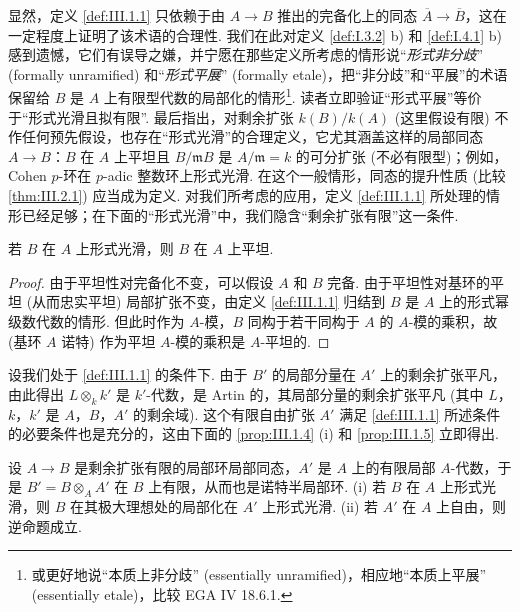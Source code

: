 \begin{remark}\label{rem:III.1.2}
显然，定义 \ref{def:III.1.1} 只依赖于由 $A \to B$ 推出的完备化上的同态 $\overline{A} \to \overline{B}$，这在一定程度上证明了该术语的合理性. 我们在此对定义 \ref{def:I.3.2} b) 和 \ref{def:I.4.1} b) 感到遗憾，它们有误导之嫌，并宁愿在那些定义所考虑的情形说``\emph{形式非分歧}'' (formally unramified) 和``\emph{形式平展}'' (formally etale)，把``非分歧''和``平展''的术语保留给 $B$ 是 $A$ 上有限型代数的局部化的情形\footnote{或更好地说``本质上非分歧'' (essentially unramified)，相应地``本质上平展'' (essentially etale)，比较 EGA IV 18.6.1.}. 读者立即验证``形式平展''等价于``形式光滑且拟有限''. 最后指出，对剩余扩张 $k(B)/k(A)$ (这里假设有限) 不作任何预先假设，也存在``形式光滑''的合理定义，它尤其涵盖这样的局部同态 $A \to B$：$B$ 在 $A$ 上平坦且 $B/\mathfrak{m}B$ 是 $A/\mathfrak{m} = k$ 的可分扩张 (不必有限型)；例如，Cohen $p$-环在 $p$-adic 整数环上形式光滑. 在这个一般情形，同态的提升性质 (比较 \ref{thm:III.2.1}) 应当成为定义. 对我们所考虑的应用，定义 \ref{def:III.1.1} 所处理的情形已经足够；在下面的``形式光滑''中，我们隐含``剩余扩张有限''这一条件.
\end{remark}

\begin{lemma}\label{lem:III.1.3}
若 $B$ 在 $A$ 上形式光滑，则 $B$ 在 $A$ 上平坦.
\end{lemma}

\begin{proof}
由于平坦性对完备化不变，可以假设 $A$ 和 $B$ 完备. 由于平坦性对基环的平坦 (从而忠实平坦) 局部扩张不变，由定义 \ref{def:III.1.1} 归结到 $B$ 是 $A$ 上的形式幂级数代数的情形. 但此时作为 $A$-模，$B$ 同构于若干同构于 $A$ 的 $A$-模的乘积，故 (基环 $A$ 诺特) 作为平坦 $A$-模的乘积是 $A$-平坦的.
\end{proof}

设我们处于 \ref{def:III.1.1} 的条件下. 由于 $B'$ 的局部分量在 $A'$ 上的剩余扩张平凡，由此得出 $L \otimes_k k'$ 是 $k'$-代数，是 Artin 的，其局部分量的剩余扩张平凡 (其中 $L$，$k$，$k'$ 是 $A$，$B$，$A'$ 的剩余域). 这个有限自由扩张 $A'$ 满足 \ref{def:III.1.1} 所述条件的必要条件也是充分的，这由下面的 \ref{prop:III.1.4} (i) 和 \ref{prop:III.1.5} 立即得出.

\begin{proposition}\label{prop:III.1.4}
设 $A \to B$ 是剩余扩张有限的局部环局部同态，$A'$ 是 $A$ 上的有限局部 $A$-代数，于是 $B' = B \otimes_A A'$ 在 $B$ 上有限，从而也是诺特半局部环. (i) 若 $B$ 在 $A$ 上形式光滑，则 $B$ 在其极大理想处的局部化在 $A'$ 上形式光滑. (ii) 若 $A'$ 在 $A$ 上自由，则逆命题成立.
\end{proposition}

